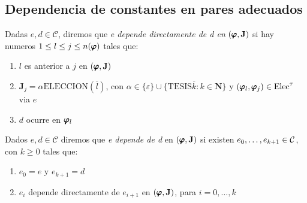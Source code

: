 \subsection{Dependencia de constantes en pares adecuados}
\begin{definition}
  Dadas $e,d\in\mathcal{C}$, diremos que \emph{e depende directamente de d en } $(\pmb{\varphi}, \mathbf{J})$ si hay numeros $1\leq l\leq j \leq n(\pmb{\varphi})$ tales que:
  \begin{enumerate}
    \item $l$ es anterior a $j$ en $(\pmb{\varphi}, \mathbf{J})$
    \item $\mathbf{J}_j=\alpha \text{ELECCION}(\overline{l})$, con $\alpha\in\{\varepsilon\}\cup\{\text{TESIS}\overline{k}:k\in\mathbf{N}\}$ y $(\pmb{\varphi}_l,\pmb{\varphi}_j)\in \text{Elec}^\tau$ via $e$
    \item $d$ ocurre en $\pmb{\varphi}_l$
  \end{enumerate} 

  Dados $e,d\in\mathcal{C}$ diremos que \emph{e depende de d} en $(\pmb{\varphi}, \mathbf{J})$ si existen $e_{0}, \dots, e_{k+1}\in\mathcal{C}$,
  con $k\geq0$ tales que:
  \begin{enumerate}
    \item $e_0=e$ y $e_{k+1}=d$
    \item $e_i$ depende directamente de $e_{i+1}$ en $(\pmb{\varphi}, \mathbf{J})$, para $i=0,\dots,k$
  \end{enumerate}
\end{definition}
